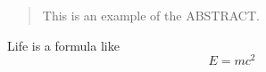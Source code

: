 \documentclass{mcmthesis}%
\begin{document}
\begin{abstract}%
This is an example of the ABSTRACT.
\end{abstract}

\maketitle%

Life is a formula like
$$E=mc^2$$
\end{document}
